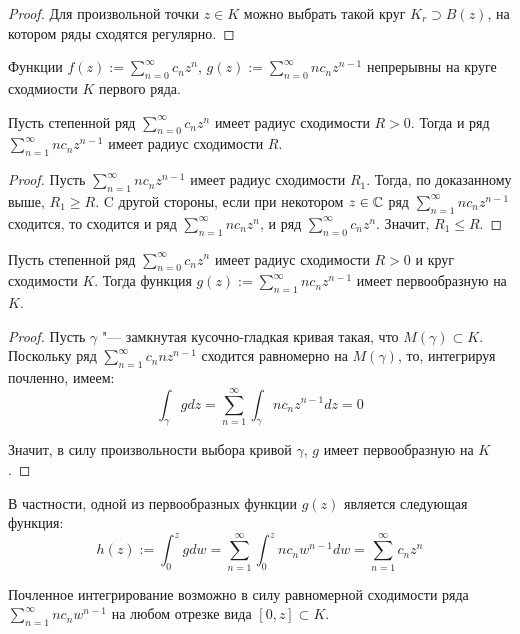 \begin{proof}
	Для произвольной точки $z \in K$ можно выбрать такой круг $K_r \supset B(z)$, на котором ряды сходятся регулярно.
\end{proof}

\begin{corollary}
	Функции $f(z) := \sum_{n = 0}^\infty c_nz^n$, $g(z) := \sum_{n = 0}^\infty nc_nz^{n-1}$ непрерывны на круге сходмиости $K$ первого ряда.
\end{corollary}

\begin{corollary}
	Пусть степенной ряд $\sum_{n=0}^\infty c_nz^n$ имеет радиус сходимости $R > 0$. Тогда и ряд $\sum_{n = 1}^\infty nc_nz^{n-1}$ имеет радиус сходимости $R$.
\end{corollary}

\begin{proof}
	Пусть $\sum_{n = 1}^\infty nc_nz^{n-1}$ имеет радиус сходимости $R_1$. Тогда, по доказанному выше, $R_1 \ge R$. C другой стороны, если при некотором $z \in \mathbb{C}$ ряд $\sum_{n = 1}^\infty nc_nz^{n-1}$ сходится, то сходится и ряд $\sum_{n = 1}^\infty nc_nz^n$, и ряд $\sum_{n = 0}^\infty c_nz^n$. Значит, $R_1 \le R$.
\end{proof}

\begin{corollary}
	Пусть степенной ряд $\sum_{n=0}^\infty c_nz^n$ имеет радиус сходимости $R > 0$ и круг сходимости $K$. Тогда функция $g(z) := \sum_{n = 1}^\infty nc_nz^{n-1}$ имеет первообразную на $K$.
\end{corollary}

\begin{proof}
	Пусть $\gamma$ "--- замкнутая кусочно-гладкая кривая такая, что $M(\gamma) \subset K$. Поскольку ряд $\sum_{n = 1}^\infty c_nnz^{n-1}$ сходится равномерно на $M(\gamma)$, то, интегрируя почленно, имеем:
	\[\int_\gamma gdz = \sum_{n = 1}^\infty \int_\gamma nc_nz^{n-1}dz = 0\]
	
	Значит, в силу произвольности выбора кривой $\gamma$, $g$ имеет первообразную на $K$.
\end{proof}

\begin{note}
	В частности, одной из первообразных функции $g(z)$ является следующая функция:
	\[h(z) := \int_0^zgdw = \sum_{n=1}^\infty \int_0^znc_nw^{n-1}dw = \sum_{n=1}^\infty c_nz^n\]
	
	Почленное интегрирование возможно в силу равномерной сходимости ряда $\sum_{n = 1}^\infty n c_nw^{n-1}$ на любом отрезке вида $[0, z] \subset K$.
\end{note}


